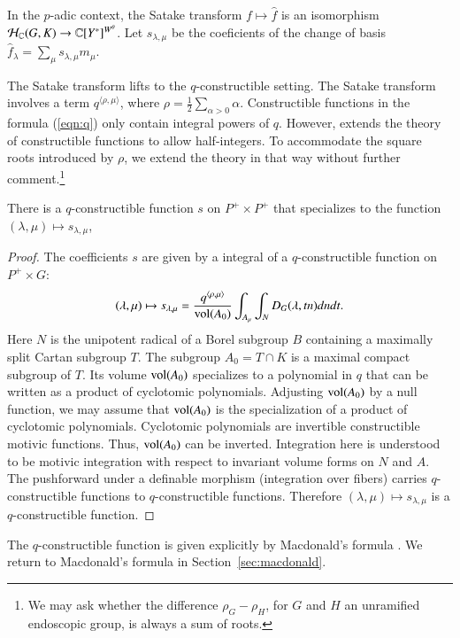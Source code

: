 In the $p$-adic context, the Satake transform $f\mapsto \hat f$
is an isomorphism  $\mathcal H_{\mathbb{C}}(G,K)\to\mathbb{C}[Y^*]^{W^\theta}$.
Let $s_{\lambda,\mu}$ be the coeficients of the change of basis $\hat f_\lambda = \sum_\mu s_{\lambda,\mu} m_\mu$.

The Satake transform lifts to the $q$-constructible setting.  The Satake transform involves
a term $q^{\langle\rho,\mu\rangle}$, where $\rho = \frac{1}{2} \sum_{\alpha > 0} \alpha$.   Constructible functions
in the formula (\ref{eqn:q})  only contain integral powers of $q$.  However, \cite[\S B.3.1]{cluckers2011local} 
extends the theory of constructible functions to allow half-integers.  To accommodate the square roots introduced by $\rho$,
we extend
the theory in that way without further comment.\footnote{We may ask whether the difference $\rho_G - \rho_H$,
for $G$ and $H$ an unramified endoscopic group, is always a sum of roots.}

\begin{lemma}\label{lemma:satake} There is a $q$-constructible function $s$ on $P^+\times P^+$ that
specializes to the function $(\lambda,\mu)\mapsto s_{\lambda,\mu}$,
\end{lemma}

\begin{proof} 
The coefficients $s$ are given by a integral of a $q$-constructible function on $P^+\times G$:
\[
(\lambda,\mu)\mapsto s_{\lambda,\mu}=\frac{q^{\langle\rho,\mu\rangle}}{{\operatorname{vol}}(A_0)} \int_{A_\mu} \int_N D_G(\lambda,t n) dn dt.
\]
Here $N$ is the unipotent radical of a Borel subgroup $B$ containing a maximally split Cartan subgroup
$T$.  The subgroup $A_0 = T\cap K$ is a maximal compact subgroup of $T$.  Its volume ${\operatorname{vol}}(A_0)$ specializes
to a polynomial in $q$ that can be written as a product of cyclotomic polynomials.  Adjusting ${\operatorname{vol}}(A_0)$ by a 
null function, we may assume that ${\operatorname{vol}}(A_0)$ is the specialization of a product of cyclotomic polynomials.
Cyclotomic polynomials are invertible constructible motivic functions.  Thus, ${\operatorname{vol}}(A_0)$ can be inverted.
  Integration here is understood to be motivic integration with respect to invariant volume forms on $N$ and $A$.
The pushforward under a definable morphism (integration over fibers) carries $q$-constructible functions
to $q$-constructible functions.
Therefore $(\lambda,\mu)\mapsto s_{\lambda,\mu}$ is a $q$-constructible function.
\end{proof}

The $q$-constructible function is given explicitly by Macdonald's formula \cite{casselman1980unramified}.
We return to Macdonald's formula in Section~\ref{sec:macdonald}.


